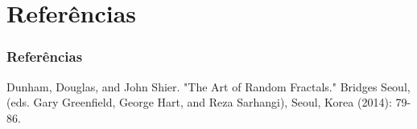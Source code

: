\documentclass[aspectratio=169]{beamer}
\begin{document}
\section{Referências}

\begin{frame}
\frametitle{Referências}

Dunham, Douglas, and John Shier. "The Art of Random Fractals." Bridges Seoul,(eds. Gary Greenfield, George Hart, and Reza Sarhangi), Seoul, Korea (2014): 79-86.

\end{frame}
\end{document}
